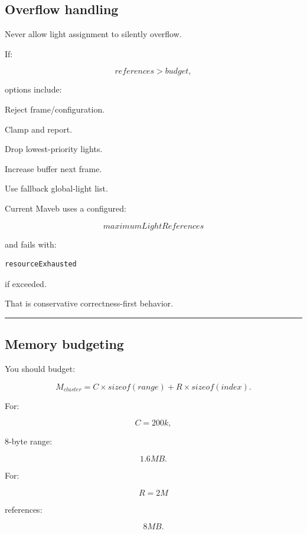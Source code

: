 \subsection{Overflow handling}\label{04-visual-computing-ii-ch040-overflow-handling}

\hypertarget{04-visual-computing-ii-ch040-overflow-handling}{}

Never allow light assignment to silently overflow.

If:

\[
references>budget,
\]

options include:

Reject frame/configuration.

Clamp and report.

Drop lowest-priority lights.

Increase buffer next frame.

Use fallback global-light list.

Current Maveb uses a configured:

\[
maximumLightReferences
\]

and fails with:

\begin{verbatim}
resourceExhausted
\end{verbatim}

if exceeded.

That is conservative correctness-first behavior.

\begin{center}\rule{0.5\linewidth}{0.5pt}\end{center}

\subsection{Memory budgeting}\label{04-visual-computing-ii-ch040-memory-budgeting}

\hypertarget{04-visual-computing-ii-ch040-memory-budgeting}{}

You should budget:

\[
M_{cluster}
=
C\times sizeof(range)
+
R\times sizeof(index).
\]

For:

\[
C=200k,
\]

8-byte range:

\[
1.6MB.
\]

For:

\[
R=2M
\]

references:

\[
8MB.
\]

